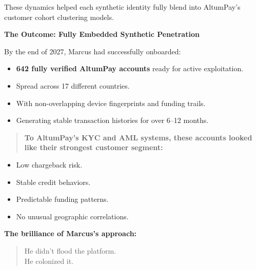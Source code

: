 These dynamics helped each synthetic identity fully blend into AltumPay’s customer cohort clustering models.

\medskip

\textbf{The Outcome: Fully Embedded Synthetic Penetration}

By the end of 2027, Marcus had successfully onboarded:

\begin{itemize}
    \item \textbf{642 fully verified AltumPay accounts} ready for active exploitation.
    \item Spread across 17 different countries.
    \item With non-overlapping device fingerprints and funding trails.
    \item Generating stable transaction histories for over 6--12 months.
\end{itemize}

\begin{quote}
\textbf{To AltumPay’s KYC and AML systems, these accounts looked like their strongest customer segment:}
\end{quote}

\begin{itemize}
    \item Low chargeback risk.
    \item Stable credit behaviors.
    \item Predictable funding patterns.
    \item No unusual geographic correlations.
\end{itemize}

\medskip

\textbf{The brilliance of Marcus's approach:}

\begin{quote}
He didn’t flood the platform. \\
He colonized it.
\end{quote}

